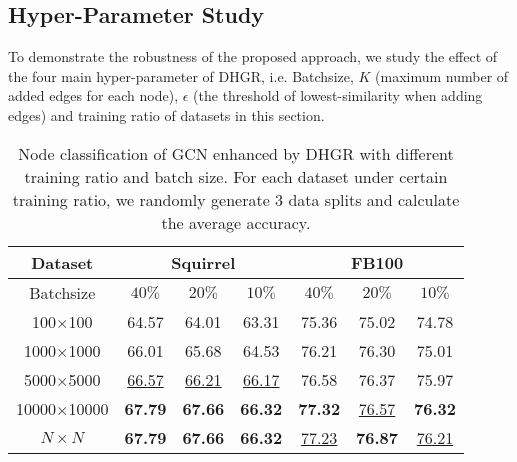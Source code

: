 \documentclass[sigconf]{acmart}
\begin{document}
	\subsection{Hyper-Parameter Study}
	To demonstrate the robustness of the proposed approach, we study the effect of the four main hyper-parameter of DHGR, i.e. Batchsize,   $K$ (maximum number of added edges for each node), $\epsilon$ (the threshold of lowest-similarity when adding edges) and training ratio of datasets in this section.
	\begin{table}
\centering
		\setlength{\tabcolsep}{5.0pt}
		\caption{Node classification of GCN enhanced by DHGR with different training ratio and batch size. For each dataset under certain training ratio, we randomly generate 3 data splits and calculate the average accuracy. }
		\label{tab:res_bs}
		\begin{tabular}{ccccccc}
			\toprule
Dataset & \multicolumn{3}{c}{Squirrel} & \multicolumn{3}{c}{FB100}  \\
			\midrule
			Batchsize &$40\%$&$20\%$& $10\%$&$40\%$&$20\%$& $10\%$\\
			\midrule
			100$\times$100 & 64.57 & 64.01 & 63.31 & 75.36 & 75.02 & 74.78  \\
			1000$\times$1000 & 66.01 & 65.68 & 64.53  & 76.21 & 76.30 & 75.01  \\
			5000$\times$5000 & \underline{66.57} & \underline{66.21} & \underline{66.17} & 76.58 & 76.37 & 75.97  \\
			10000$\times$10000 & \textbf{67.79} & \textbf{67.66} & \textbf{66.32} &\textbf{ 77.32} & \underline{76.57} & \textbf{76.32}   \\
			$N\times N$ & \textbf{67.79} & \textbf{67.66} & \textbf{66.32}  & \underline{77.23} & \textbf{76.87} & \underline{76.21 } \\
			\bottomrule
		\end{tabular}
		
	\end{table}
\end{document}
